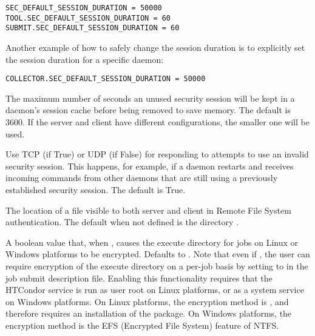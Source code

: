 \begin{description}
\begin{verbatim}
SEC_DEFAULT_SESSION_DURATION = 50000
TOOL.SEC_DEFAULT_SESSION_DURATION = 60
SUBMIT.SEC_DEFAULT_SESSION_DURATION = 60
\end{verbatim}

Another example of how to safely change the session duration is to
explicitly set the session duration for a specific daemon:

\begin{verbatim}
COLLECTOR.SEC_DEFAULT_SESSION_DURATION = 50000
\end{verbatim}

\label{param:SecDefaultSessionLease}
\item[\Macro{SEC\_<access-level>\_SESSION\_LEASE}]
  The maximum number of seconds an unused security session will be
  kept in a daemon's session cache before being removed to save memory.
  The default is 3600.  If the server and client have different
  configurations, the smaller one will be used.

\label{param:SecInvalidateSessionsViaTcp}
\item[\Macro{SEC\_INVALIDATE\_SESSIONS\_VIA\_TCP}]
  Use TCP (if True) or UDP (if False)
  for responding to attempts to use an invalid security session.  This happens,
  for example, if a daemon restarts and receives incoming commands from
  other daemons that are still using a previously established security session.
  The default is True.

\label{param:FSRemoteDir}
\item[\Macro{FS\_REMOTE\_DIR}]
  The location of a file visible to both server and client in
  Remote File System authentication.
  The default when not defined is the directory 
  .

\label{param:EncryptExecuteDirectory}
\item[\Macro{ENCRYPT\_EXECUTE\_DIRECTORY}]
  A boolean value that, when , 
  causes the execute directory for jobs on Linux or Windows platforms to be
  encrypted.
  Defaults to .  
  Note that even if , 
  the user can require encryption of the execute directory on a per-job 
  basis by setting  to  
  in the job submit description file.
  Enabling this functionality requires that the HTCondor service
  is run as user root on Linux platforms,
  or as a system service on Windows platforms.
  On Linux platforms, the encryption method is ,
  and therefore requires an installation of the  package.
  On Windows platforms, the encryption method is the EFS (Encrypted File System)
  feature of NTFS.


\end{description}
